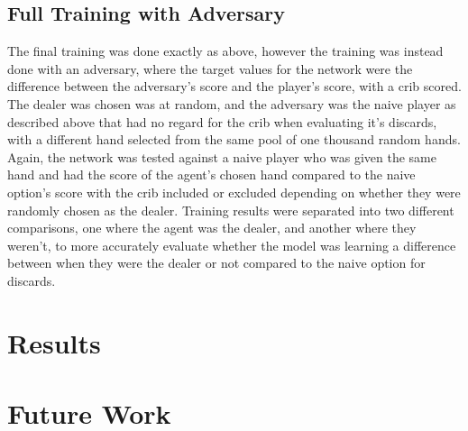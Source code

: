 \documentclass[]{article}
\begin{document}
\subsection{Full Training with Adversary}

The final training was done exactly as above, however the training was instead done with an adversary, where the target values for the network were the difference between the adversary's score and the player's score, with a crib scored. The dealer was chosen was at random, and the adversary was the naive player as described above that had no regard for the crib when evaluating it's discards, with a different hand selected from the same pool of one thousand random hands. Again, the network was tested against a naive player who was given the same hand and had the score of the agent's chosen hand compared to the naive option's score with the crib included or excluded depending on whether they were randomly chosen as the dealer. Training results were separated into two different comparisons, one where the agent was the dealer, and another where they weren't, to more accurately evaluate whether the model was learning a difference between when they were the dealer or not compared to the naive option for discards.

\section{Results}

\section{Future Work}



\newpage


\end{document}
